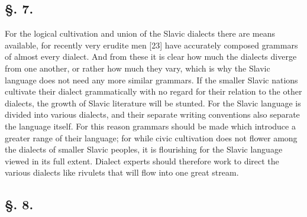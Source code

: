 \subsection*{\hspace*{\fill}§. 7.\hspace*{\fill}}

For the logical cultivation and union of the Slavic dialects there are means available, for recently very erudite men [23] have accurately composed grammars of almost every dialect. And from these it is clear how much the dialects diverge from one another, or rather how much they vary, which is why the Slavic language does not need any more similar grammars. If the smaller Slavic nations cultivate their dialect grammatically with no regard for their relation to the other dialects, the growth of Slavic literature will be stunted. For the Slavic language is divided into various dialects, and their separate writing conventions also separate the language itself. For this reason grammars should be made which introduce a greater range of their language; for while civic cultivation does not flower among the dialects of smaller Slavic peoples, it is flourishing for the Slavic language viewed in its full extent. Dialect experts should therefore work to direct the various dialects like rivulets that will flow into one great stream.

\subsection*{\hspace*{\fill}§. 8.\hspace*{\fill}}

